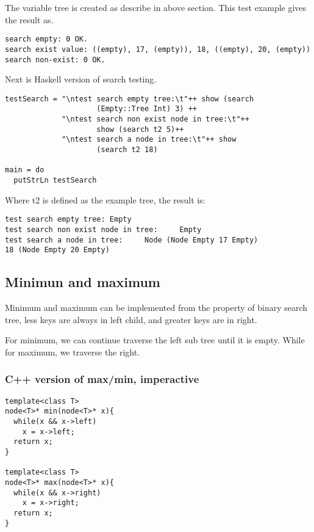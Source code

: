 \documentclass{article}
\begin{document}
The variable tree is created as describe in above section. This test example 
gives the result as.
\begin{verbatim}
search empty: 0 OK.
search exist value: ((empty), 17, (empty)), 18, ((empty), 20, (empty))
search non-exist: 0 OK.
\end{verbatim}

Next is Haskell version of search testing.

\lstset{language=Haskell}
\begin{lstlisting}
testSearch = "\ntest search empty tree:\t"++ show (search 
                     (Empty::Tree Int) 3) ++
             "\ntest search non exist node in tree:\t"++ 
                     show (search t2 5)++
             "\ntest search a node in tree:\t"++ show 
                     (search t2 18)

main = do
  putStrLn testSearch
\end{lstlisting}

Where t2 is defined as the example tree, the result is:
\begin{verbatim}
test search empty tree: Empty
test search non exist node in tree:     Empty
test search a node in tree:     Node (Node Empty 17 Empty) 
18 (Node Empty 20 Empty)
\end{verbatim}


\subsection{Minimun and maximum}

Minimum and maximum can be implemented from the property of binary search
tree, less keys are always in left child, and greater keys are in right.

For minimum, we can continue traverse the left sub tree until it is empty.
While for maximum, we traverse the right.

\subsubsection*{C++ version of max/min, imperactive}

\lstset{language=c++}
\begin{lstlisting}
template<class T>
node<T>* min(node<T>* x){
  while(x && x->left)
    x = x->left;
  return x;
}

template<class T>
node<T>* max(node<T>* x){
  while(x && x->right)
    x = x->right;
  return x;
}
\end{lstlisting}
\end{document}
